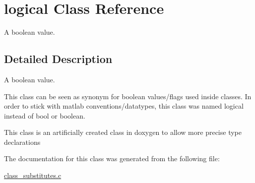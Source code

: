\hypertarget{a00009}{\section{logical Class Reference}
\label{a00009}
}


A boolean value.  




\subsection{Detailed Description}
A boolean value. 

This class can be seen as synonym for boolean values/flags used inside classes. In order to stick with matlab conventions/datatypes, this class was named logical instead of bool or boolean.

This class is an artificially created class in doxygen to allow more precise type declarations 

The documentation for this class was generated from the following file\-:\begin{DoxyCompactItemize}
\item 
\hyperlink{a00016}{class\-\_\-substitutes.\-c}\end{DoxyCompactItemize}
